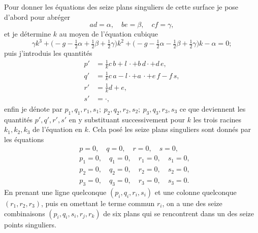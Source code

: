 \documentclass[11pt]{article}
\begin{document}
Pour donner les \'equations des seize plans singuliers de cette surface je pose d'abord pour abr\'eger
\[
ad = \alpha,\quad be = \beta,\quad cf = \gamma,
\]
et je d\'etermine $k$ au moyen de l'\'equation cubique
\[
\gamma k^{3} + \bigl(- g - \tfrac{1}{2}\alpha + \tfrac{1}{2}\beta + \tfrac{1}{2}\gamma\bigr) k^{2} + \bigl(- g - \tfrac{1}{2}\alpha - \tfrac{1}{2}\beta + \tfrac{1}{2}\gamma\bigr) k - \alpha = 0;
\]
puis j'introduis les quantit\'es
\begin{align*}
p' &= \tfrac{1}{k} c\, b + l\, \cdot + b\, d \cdot + d\, e, \\
q' &= \tfrac{1}{k} c\, a - l \cdot + a\, \cdot + e\, f - f\, s, \\
r' &= \tfrac{1}{k} d + e, \\
s' &= \cdot ,
\end{align*}
enfin je d\'enote par $p_{1}, q_{1}, r_{1}, s_{1};\ p_{2}, q_{2}, r_{2}, s_{2};\ p_{3}, q_{3}, r_{3}, s_{3}$ ce que deviennent les quantit\'es $p', q', r', s'$ en y substituant successivement pour $k$ les trois racines $k_{1}, k_{2}, k_{3}$ de l'\'equation en $k$. Cela pos\'e les seize plans singuliers sont donn\'es par les \'equations
\begin{align*}
& p = 0,\quad q = 0,\quad r = 0,\quad s = 0, \\
& p_{1} = 0,\quad q_{1} = 0,\quad r_{1} = 0,\quad s_{1} = 0, \\
& p_{2} = 0,\quad q_{2} = 0,\quad r_{2} = 0,\quad s_{2} = 0, \\
& p_{3} = 0,\quad q_{3} = 0,\quad r_{3} = 0,\quad s_{3} = 0.
\end{align*}
En prenant une ligne quelconque $(p_{i}, q_{i}, r_{i}, s_{i})$ et une colonne quelconque $(r_{1}, r_{2}, r_{3})$, puis en omettant le terme commun $r_{i}$, on a une des seize combinaisons $(p_{i}, q_{i}, s_{i}, r_{j}, r_{k})$ de six plans qui se rencontrent dans un des seize points singuliers.
\end{document}
